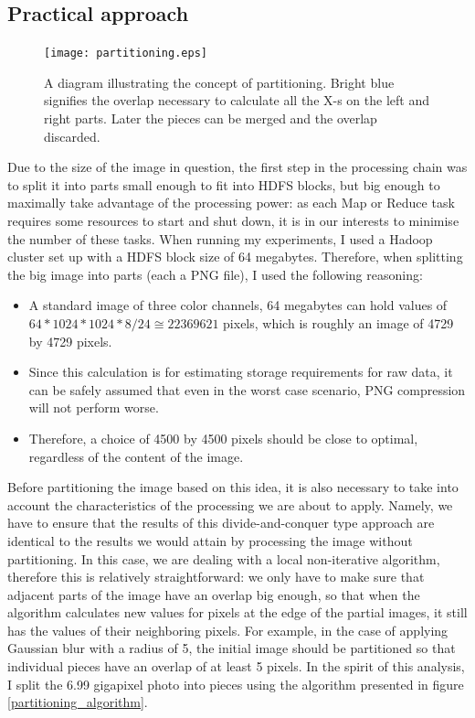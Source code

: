 \documentclass [12pt,a4paper]{report}
\begin{document}
\subsection{Practical approach}

\begin{figure}[h]
\begin{center}
\texttt{[image: partitioning.eps]} %
\caption[A diagram illustrating the concept of partitioning]{A diagram illustrating the concept of partitioning. Bright blue signifies the overlap necessary to calculate all the X-s on the left and right parts. Later the pieces can be merged and the overlap discarded.}
\label{fig_partitioning}
\end{center}
\end{figure}

Due to the size of the image in question, the first step in the processing chain was to split it into parts small enough to fit into HDFS blocks, but big enough to maximally take advantage of the processing power: as each Map or Reduce task requires some resources to start and shut down, it is in our interests to minimise the number of these tasks. When running my experiments, I used a Hadoop cluster set up with a HDFS block size of 64 megabytes. Therefore, when splitting the big image into parts (each a PNG file), I used the following reasoning:

\begin{itemize}
\item A standard image of three color channels, 64 megabytes can hold values of $64*1024*1024*8/24\cong22369621$ pixels, which is roughly an image of 4729 by 4729 pixels.
\item Since this calculation is for estimating storage requirements for raw data, it can be safely assumed that even in the worst case scenario, PNG compression will not perform worse.
\item Therefore, a choice of 4500 by 4500 pixels should be close to optimal, regardless of the content of the image.
\end{itemize}

Before partitioning the image based on this idea, it is also necessary to take into account the characteristics of the processing we are about to apply. Namely, we have to ensure that the results of this divide-and-conquer type approach are identical to the results we would attain by processing the image without partitioning. In this case, we are dealing with a local non-iterative algorithm, therefore this is relatively straightforward: we only have to make sure that adjacent parts of the image have an overlap big enough, so that when the algorithm calculates new values for pixels at the edge of the partial images, it still has the values of their neighboring pixels. For example, in the case of applying Gaussian blur with a radius of 5, the initial image should be partitioned so that individual pieces have an overlap of at least 5 pixels. In the spirit of this analysis, I split the 6.99 gigapixel photo into pieces using the algorithm presented in figure \ref{partitioning_algorithm}.
\end{document}
